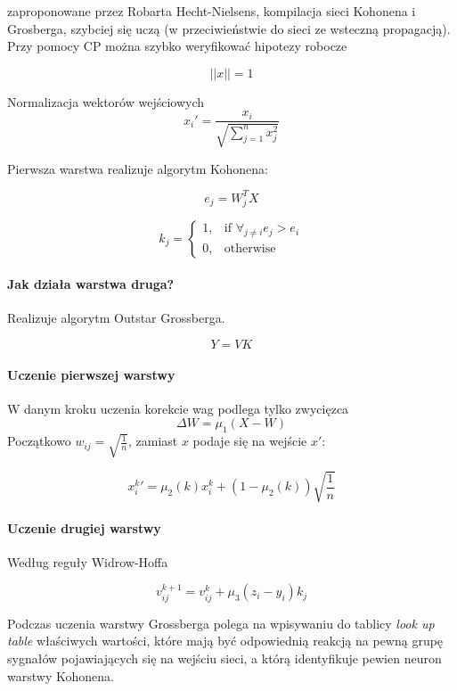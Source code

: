 zaproponowane przez Robarta Hecht-Nielsens, kompilacja sieci Kohonena i Grosberga, szybciej się uczą (w przeciwieństwie
do sieci ze wsteczną propagacją). Przy pomocy CP można szybko weryfikować hipotezy robocze

\begin{equation}
 || x || = 1
\end{equation}

Normalizacja wektorów wejściowych
\begin{equation}
 x_i' = \frac{x_i}{ \sqrt{ \sum_{j=1}^n x_j^2 }  }
\end{equation}

Pierwsza warstwa realizuje algorytm Kohonena:

\begin{equation}
 e_j = W_j^T X
\end{equation}

\begin{equation}
 k_j = \begin{cases}
    1,& \text{if } \forall_{j \ne i} e_j > e_i \\
    0,              & \text{otherwise}
\end{cases}
\end{equation}


\paragraph{Jak działa warstwa druga?}

Realizuje algorytm Outstar Grossberga.

\begin{equation}
 Y = V K
\end{equation}

\paragraph{Uczenie pierwszej warstwy}

W danym kroku uczenia korekcie wag podlega tylko zwycięzca
\begin{equation}
 \Delta W = \mu_1 (X - W)
\end{equation}
Początkowo $w_{ij} = \sqrt{\frac{1}{n}}$, zamiast $x$ podaje się na wejście $x'$:

\begin{equation}
 {x_i^k} ' = \mu_2(k) x_i^k + (1 - \mu_2(k)) \sqrt{\frac{1}{n}}
\end{equation}

\paragraph{Uczenie drugiej warstwy}

Według reguły Widrow-Hoffa

\begin{equation}
 v_{ij}^{k+1} = v_{ij}^k + \mu_3 (z_i - y_i) k_j
\end{equation}

Podczas uczenia warstwy Grossberga polega na wpisywaniu do tablicy \textit{look up table}
właściwych wartości, które mają być odpowiednią reakcją na pewną grupę sygnałów pojawiających się
na wejściu sieci, a którą identyfikuje pewien neuron warstwy Kohonena.